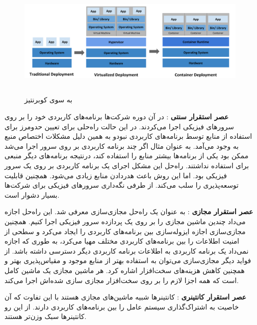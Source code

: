\begin{figure}[!h]
	\centering
	\includegraphics[height=5.5cm]{fig2-8}
	\caption{به سوی کوبرنتیز}
	\label{تصویر 2-8}
\end{figure}

\textbf{عصر استقرار سنتی}
: در آن دوره شرکت‌ها برنامه‌های کاربردی خود را بر روی سرورهای فیزیکی اجرا می‌کردند. در این حالت راه‌حلی برای تعیین حد‌و‌مرز برای استفاده از منابع توسط برنامه‌های کاربردی نبودو به همین دلیل مشکلات اختصاص منبع به وجود می‌آمد. به عنوان مثال اگر چند برنامه کاربردی بر روی سرور اجرا می‌شد ممکن بود یکی از برنامه‌ها بیشتر منابع را استفاده کند، درنتیجه برنامه‌های دیگر منبعی برای استفاده نداشتند. راه‌حل این مشکل اجرای یک برنامه کاربردی بر روی یک سرور فیزیکی بود. اما این روش باعث هدر‌دادن منابع زیادی می‌شود. همچنین قابلیت توسعه‌پذیری را سلب می‌کند. از طرفی نگه‌داری سرورهای فیزیکی برای شرکت‌ها بسیار دشوار است.  

\textbf{عصر استقرار مجازی}
: به عنوان یک راه‌حل مجازی‌سازی معرفی شد. این راه‌حل اجازه می‌داد چندین ماشین مجازی را بر روی یک پردازده سرور فیزیکی اجرا کنیم. همچنین مجازی‌سازی اجازه ایزوله‌سازی بین برنامه‌های کاربردی را ایجاد می‌کرد و سطحی از امنیت اطلاعات را بین برنامه‌های کاربردی مختلف مهیا می‌کرد، به طوری که اجازه نمی‌داد یک برنامه کاربردی به اطلاعات برنامه کاربردی دیگر دسترسی داشته باشد. از فواید دیگر مجازی‌سازی می‌توان به استفاده بهتر از منابع موجود و مقیاس‌پذیری بهتر و همچنین کاهش هزینه‌های سخت‌افزار اشاره کرد. هر ماشین مجازی یک ماشین کامل است که همه اجزا لازم  را بر روی سخت‌افزار مجازی سازی‌ شده‌اش اجرا می‌کند.

\textbf{عصر استقرار کانتینری}
: کانتینرها شبیه ماشین‌های مجازی هستند با این تفاوت که آن خاصیت به اشتراک‌گذاری سیستم عامل را بین برنامه‌های کاربردی دارند. از این رو کانتینرها سبک وزن‌تر هستند. 
\newline

